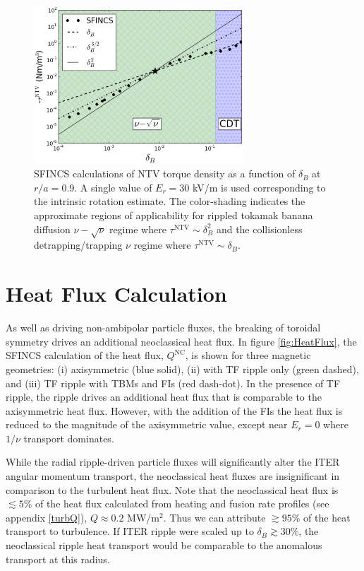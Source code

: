 \documentclass[aip, pop, preprint]{revtex4-1}
\numberwithin{figure}{section}
\numberwithin{equation}{section}
\begin{document}
\begin{figure}[h!]
\centering
\includegraphics[width=0.7\textwidth]{figure11.eps}
\caption{\label{fig:scalescan} SFINCS calculations of NTV torque density as a function of $\delta_B$ at $r/a = 0.9$. A single value of $E_r = 30$ kV/m is used corresponding to the intrinsic rotation estimate. The color-shading indicates the approximate regions of applicability for rippled tokamak banana diffusion $\nu-\sqrt{\nu}$ regime where $\tau^{\mathrm{NTV}} \sim \delta_B^2$ \cite{Shaing2008} and the collisionless detrapping/trapping $\nu$ regime where $\tau^{\mathrm{NTV}} \sim \delta_B$.\cite{Shaing2009}}
\end{figure} 

\FloatBarrier

\section{Heat Flux Calculation}\label{heatflux}
As well as driving non-ambipolar particle fluxes, the breaking of toroidal symmetry drives an additional neoclassical heat flux. In figure \ref{fig:HeatFlux}, the SFINCS calculation of the heat flux, $Q^{\mathrm{NC}}$, is shown for three magnetic geometries: (i) axisymmetric (blue solid), (ii) with TF ripple only (green dashed), and (iii) TF ripple with TBMs and FIs (red dash-dot). In the presence of TF ripple, the ripple drives an additional heat flux that is comparable to the axisymmetric heat flux. However, with the addition of the FIs the heat flux is reduced to the magnitude of the axisymmetric value, except near $E_r = 0$ where $1/\nu$ transport dominates. 

While the radial ripple-driven particle fluxes will significantly alter the ITER angular momentum transport, the neoclassical heat fluxes are insignificant in comparison to the turbulent heat flux. Note that the neoclassical heat flux is $\lesssim 5\%$  of the heat flux calculated from heating and fusion rate profiles (see appendix \ref{turbQ}), $Q\approx 0.2$ MW/m$^2$. Thus we can attribute $\gtrsim 95\%$ of the heat transport to turbulence. If ITER ripple were scaled up to $\delta_B \gtrsim 30\%$, the neoclassical ripple heat transport would be comparable to the anomalous transport at this radius.
\end{document}
